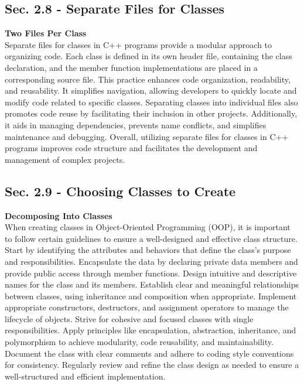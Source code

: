 \subsection*{Sec. 2.8 - Separate Files for Classes}
\noindent \textbf{Two Files Per Class} \\

Separate files for classes in C++ programs provide a modular approach to organizing code. Each class is defined in its own header file, containing the class declaration, and the member function implementations are placed in a corresponding source 
file. This practice enhances code organization, readability, and reusability. It simplifies navigation, allowing developers to quickly locate and modify code related to specific classes. Separating classes into individual files also promotes code 
reuse by facilitating their inclusion in other projects. Additionally, it aids in managing dependencies, prevents name conflicts, and simplifies maintenance and debugging. Overall, utilizing separate files for classes in C++ programs improves code 
structure and facilitates the development and management of complex projects. \\

\subsection*{Sec. 2.9 - Choosing Classes to Create}
\noindent \textbf{Decomposing Into Classes} \\

When creating classes in Object-Oriented Programming (OOP), it is important to follow certain guidelines to ensure a well-designed and effective class structure. Start by identifying the attributes and behaviors that define the class's purpose and 
responsibilities. Encapsulate the data by declaring private data members and provide public access through member functions. Design intuitive and descriptive names for the class and its members. Establish clear and meaningful relationships between 
classes, using inheritance and composition when appropriate. Implement appropriate constructors, destructors, and assignment operators to manage the lifecycle of objects. Strive for cohesive and focused classes with single responsibilities. Apply 
principles like encapsulation, abstraction, inheritance, and polymorphism to achieve modularity, code reusability, and maintainability. Document the class with clear comments and adhere to coding style conventions for consistency. Regularly review 
and refine the class design as needed to ensure a well-structured and efficient implementation. \\


